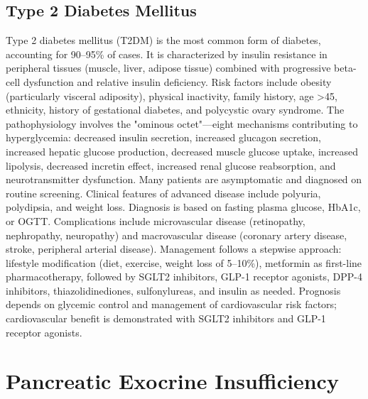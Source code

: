 \subsection{Type 2 Diabetes Mellitus}
\label{sec:Type 2 Diabetes Mellitus}
Type 2 diabetes mellitus (T2DM) is the most common form of diabetes, accounting for 90--95\% of cases. It is characterized by insulin resistance in peripheral tissues (muscle, liver, adipose tissue) combined with progressive beta-cell dysfunction and relative insulin deficiency. Risk factors include obesity (particularly visceral adiposity), physical inactivity, family history, age >45, ethnicity, history of gestational diabetes, and polycystic ovary syndrome. The pathophysiology involves the "ominous octet"---eight mechanisms contributing to hyperglycemia: decreased insulin secretion, increased glucagon secretion, increased hepatic glucose production, decreased muscle glucose uptake, increased lipolysis, decreased incretin effect, increased renal glucose reabsorption, and neurotransmitter dysfunction. Many patients are asymptomatic and diagnosed on routine screening. Clinical features of advanced disease include polyuria, polydipsia, and weight loss. Diagnosis is based on fasting plasma glucose, HbA1c, or OGTT. Complications include microvascular disease (retinopathy, nephropathy, neuropathy) and macrovascular disease (coronary artery disease, stroke, peripheral arterial disease). Management follows a stepwise approach: lifestyle modification (diet, exercise, weight loss of 5--10\%), metformin as first-line pharmacotherapy, followed by SGLT2 inhibitors, GLP-1 receptor agonists, DPP-4 inhibitors, thiazolidinediones, sulfonylureas, and insulin as needed. Prognosis depends on glycemic control and management of cardiovascular risk factors; cardiovascular benefit is demonstrated with SGLT2 inhibitors and GLP-1 receptor agonists.

\section{Pancreatic Exocrine Insufficiency}




